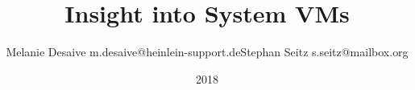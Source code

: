 \documentclass[10pt,titlepage,ngerman]{article}
\begin{document}
\begin{titlepage}
\title{Insight into System VMs}
\date{2018}
\author{Melanie Desaive m.desaive@heinlein-support.de\newline Stephan Seitz s.seitz@mailbox.org}
\maketitle
\end{titlepage}


\tableofcontents

\setcounter{page}{1}

\newpage









\newpage
\listoffigures
{}

\listoftables
{}

\newpage
\appendix



\nocite{*}


\end{document}
